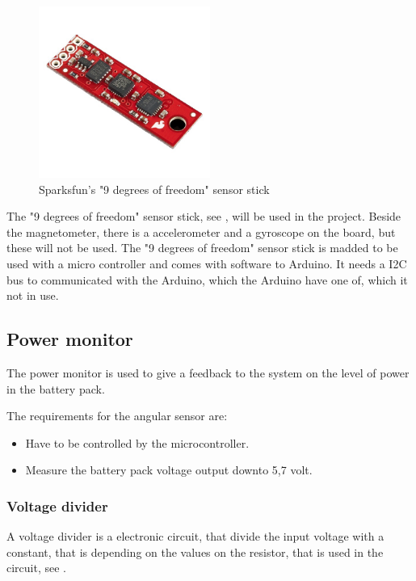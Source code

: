 \begin{figure}[H]
	\centering
	\includegraphics[width=0.50\textwidth]{figures/NineDegree}
		\caption{Sparksfun's "9 degrees of freedom" sensor stick} 
	\label{NineDegree}
\end{figure}

The "9 degrees of freedom" sensor stick, see , will be used in the project. Beside the magnetometer, there is a accelerometer and a gyroscope on the board, but these will not be used. The "9 degrees of freedom" sensor stick is madded to be used with a micro controller and comes with software to Arduino. It needs a I2C bus to communicated with the Arduino, which the Arduino have one of, which it not in use.


\subsection{Power monitor}
The power monitor is used to give a feedback to the system on the level of power in the battery pack.

The requirements for the angular sensor are:
\begin{itemize}
\item Have to be controlled by the microcontroller.
\item Measure the battery pack voltage output downto 5,7 volt.
\end{itemize}

\subsubsection{Voltage divider}
A voltage divider is a electronic circuit, that divide the input voltage with a constant, that is depending on the values on the resistor, that is used in the circuit, see .

